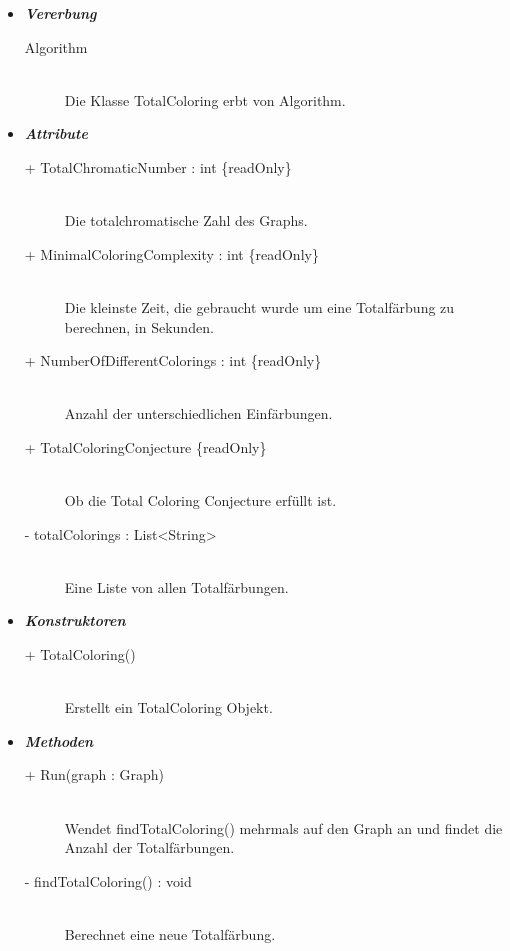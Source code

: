 \documentclass[13pt]{scrreprt}
\begin{document}
	\begin{itemize}[label = {$\circ$}]
		\item {\large \textbf{\textit{Vererbung}}\par}
		\begin{description}
			\item[Algorithm] \hfill \\Die Klasse TotalColoring erbt von Algorithm.
		\end{description}
		\item {\large \textbf{\textit{Attribute}}\par}
		\begin{description}
			\item [+ TotalChromaticNumber : int \{readOnly\}] \hfill \\Die totalchromatische Zahl des Graphs.
			\item [+ MinimalColoringComplexity : int \{readOnly\}] \hfill \\Die kleinste Zeit, die gebraucht wurde um eine Totalfärbung zu berechnen, in Sekunden.
			\item [+ NumberOfDifferentColorings : int \{readOnly\}] \hfill \\Anzahl der unterschiedlichen Einfärbungen.
			\item [+ TotalColoringConjecture \{readOnly\}] \hfill \\Ob die Total Coloring Conjecture erfüllt ist.
			\item [- totalColorings : List<String>] \hfill \\Eine Liste von allen Totalfärbungen.
		\end{description}
		\item {\large \textbf{\textit{Konstruktoren}}\par}
		\begin{description}
			\item [+ TotalColoring()] \hfill \\Erstellt ein TotalColoring Objekt.
		\end{description}
	\newpage
		\item {\large \textbf{\textit{Methoden}}\par}
		\begin{description}
			\item [+ Run(graph : Graph)] \hfill \\Wendet findTotalColoring() mehrmals auf den Graph an und findet die Anzahl der Totalfärbungen.
			\item [- findTotalColoring() : void] \hfill \\Berechnet eine neue Totalfärbung.

\end{description}
\end{itemize}
\end{document}
